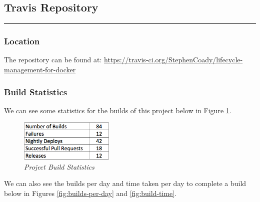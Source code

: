 \subsection{Travis Repository} 
\label{appendix:travis}
\rule{\textwidth}{0.4pt}
\subsubsection{Location}
The repository can be found at:  \url{https://travis-ci.org/StephenCoady/lifecycle-management-for-docker}

\subsubsection{Build Statistics}
We can see some statistics for the builds of this project below in Figure \ref{fig:build-stats}.

\begin{figure}[!ht]
\centering
\includegraphics*[width=0.4\textwidth]{images/build-stats}
\caption{\em Project Build Statistics}
\label{fig:build-stats}
\end{figure}

We can also see the builds per day and time taken per day to complete a build below in Figures \ref{fig:builds-per-day} and \ref{fig:build-time}.

